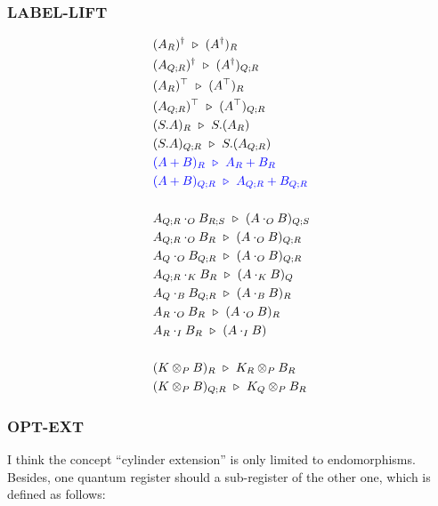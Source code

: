 \subsubsection*{\textsf{LABEL-LIFT}}
\begin{align*}
  & (A_{R})^\dagger \ \triangleright\  (A^\dagger)_{R} \\
  & (A_{Q; R})^\dagger \ \triangleright\  (A^\dagger)_{Q; R} \\
  & (A_{R})^\top \ \triangleright\  (A^\top)_{R} \\
  & (A_{Q; R})^\top \ \triangleright\  (A^\top)_{Q; R} \\
  & (S.A)_{R} \ \triangleright\  S.(A_{R}) \\
  & (S.A)_{Q; R} \ \triangleright\  S.(A_{Q; R})\\
  & \textcolor{blue}{(A + B)_{R} \ \triangleright\  A_{R} + B_{R}} \\
  & \textcolor{blue}{(A + B)_{Q; R} \ \triangleright\  A_{Q; R} + B_{Q; R}} \\
  \\
  & A_{Q; R} \cdot_O B_{R; S} \ \triangleright\  (A \cdot_O B)_{Q; S} \\
  & A_{Q; R} \cdot_O B_{R} \ \triangleright\  (A \cdot_O B)_{Q; R} \\
  & A_{Q} \cdot_O B_{Q; R} \ \triangleright\  (A \cdot_O B)_{Q; R} \\
  & A_{Q; R} \cdot_K B_{R} \ \triangleright\  (A \cdot_K B)_{Q} \\
  & A_{Q} \cdot_B B_{Q; R} \ \triangleright\  (A \cdot_B B)_{R} \\
  & A_{R} \cdot_O B_{R} \ \triangleright\  (A \cdot_O B)_{R} \\
  & A_{R} \cdot_I B_{R} \ \triangleright\  (A \cdot_I B) \\
  \\
  & (K \otimes_P B)_{R} \ \triangleright\  K_{R} \otimes_P B_{R} \\
  & (K \otimes_P B)_{Q; R} \ \triangleright\  K_{Q} \otimes_P B_{R}
\end{align*}

\subsubsection*{\textsf{OPT-EXT}}
I think the concept ``cylinder extension'' is only limited to endomorphisms. Besides, one quantum register should a sub-register of the other one, which is defined as follows:

